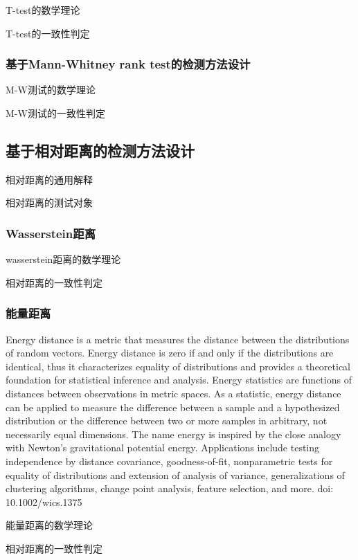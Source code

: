 T-test的数学理论

T-test的一致性判定

\subsubsection{基于Mann-Whitney rank test的检测方法设计}
\label{chap:analyze:statistical:test:mw}

M-W测试的数学理论

M-W测试的一致性判定

\subsection{基于相对距离的检测方法设计}
\label{chap:analyze:statistical:distance}

相对距离的通用解释

相对距离的测试对象

\subsubsection{Wasserstein距离}
\label{chap:analyze:statistical:distance:wasserstein}

wasserstein距离的数学理论

相对距离的一致性判定

\subsubsection{能量距离}
\label{chap:analyze:statistical:distance:energy}

Energy distance is a metric that measures the distance between the distributions of random vectors. Energy distance is zero if and only if the distributions are identical, thus it characterizes equality of distributions and provides a theoretical foundation for statistical inference and analysis. Energy statistics are functions of distances between observations in metric spaces. As a statistic, energy distance can be applied to measure the difference between a sample and a hypothesized distribution or the difference between two or more samples in arbitrary, not necessarily equal dimensions. The name energy is inspired by the close analogy with Newton's gravitational potential energy. Applications include testing independence by distance covariance, goodness‐of‐fit, nonparametric tests for equality of distributions and extension of analysis of variance, generalizations of clustering algorithms, change point analysis, feature selection, and more. doi: 10.1002/wics.1375

能量距离的数学理论

相对距离的一致性判定